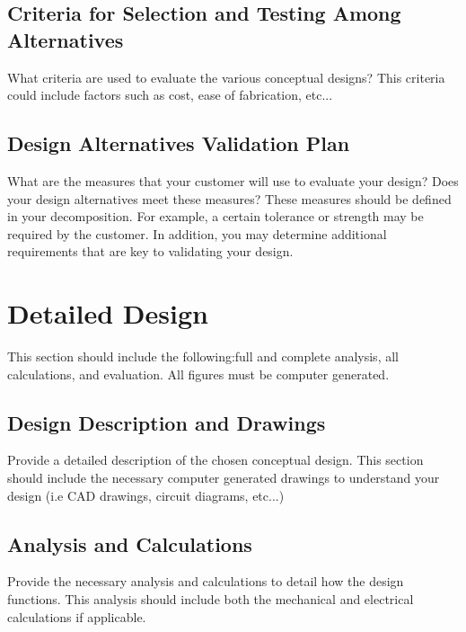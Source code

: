 \documentclass{other/docTemplate}
\begin{document}
\subsection{Criteria for Selection and Testing Among Alternatives}

What criteria are used to evaluate the various conceptual designs? This criteria could include factors such as cost, ease of fabrication, etc...


\subsection{Design Alternatives Validation Plan}

What are the measures that your customer will use to evaluate your design? Does your design alternatives meet these measures? These measures should be defined in your decomposition. For example, a certain tolerance or strength may be required by the customer. In addition, you may determine additional requirements that are key to validating your design. 



\clearpage
\section{Detailed Design}
This section should include the following:full and complete analysis, all calculations, and evaluation. All figures must be computer generated. 

\subsection{Design Description and Drawings}
Provide a detailed description of the chosen conceptual design. This section should include the necessary computer generated drawings to understand your design (i.e CAD drawings, circuit diagrams, etc...)

\subsection{Analysis and Calculations}
Provide the necessary analysis and calculations to detail how the design functions. This analysis should include both the mechanical and electrical calculations if applicable.
\end{document}
